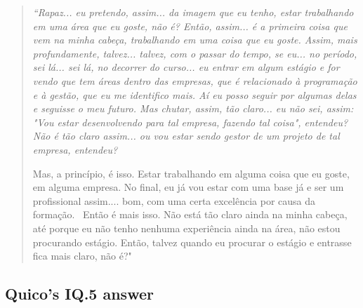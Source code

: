 \begin{quote}
    \itshape
    “Rapaz... eu pretendo, assim... da imagem que eu tenho, estar trabalhando em uma área que eu goste, não é? Então, assim... é a primeira coisa que vem na minha cabeça, trabalhando em uma coisa que eu goste. Assim, mais profundamente, talvez... talvez, com o passar do tempo, se eu... no período, sei lá... sei lá, no decorrer do curso... eu entrar em algum estágio e for vendo que tem áreas dentro das empresas, que é relacionado à programação e à gestão, que eu me identifico mais. Aí eu posso seguir por algumas delas e seguisse o meu futuro. Mas chutar, assim, tão claro... eu não sei, assim: "Vou estar desenvolvendo para tal empresa, fazendo tal coisa", entendeu? Não é tão claro assim... ou vou estar sendo gestor de um projeto de tal empresa, entendeu?
    
    Mas, a princípio, é isso. Estar trabalhando em alguma coisa que eu goste, em alguma empresa. No final, eu já vou estar com uma base já e ser um profissional assim.... bom, com uma certa excelência por causa da formação.  Então é mais isso. Não está tão claro ainda na minha cabeça, até porque eu não tenho nenhuma experiência ainda na área, não estou procurando estágio. Então, talvez quando eu procurar o estágio e entrasse fica mais claro, não é?"
\end{quote}


\subsection{Quico’s IQ.5 answer}
\label{interview-exc-ss:quico-iq5}

